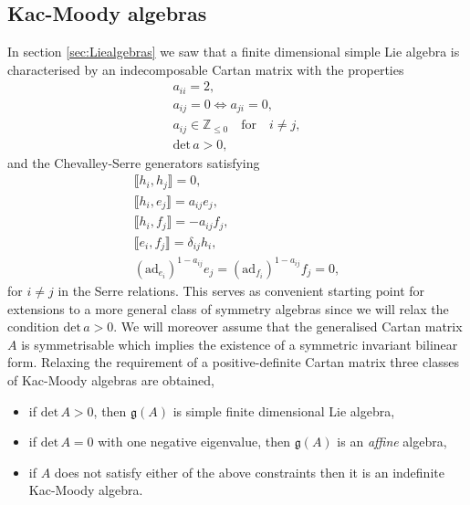 \subsection{Kac-Moody algebras}\label{sec:KacMoody}
In section \ref{sec:Liealgebras} we saw that a finite dimensional simple Lie algebra is characterised by an indecomposable Cartan matrix with the properties 
\begin{equation}
    \begin{aligned}
        a_{ii} = 2,\\
        a_{ij} = 0 \Longleftrightarrow a_{ji} = 0,\\
        a_{ij}\in \mathbb{Z}_{\leq 0} \quad\text{for}\quad i\neq j,\\
        \text{det}\,a >0,
    \end{aligned}
\end{equation}
and the Chevalley-Serre generators satisfying 
\begin{equation}
\begin{aligned}\label{eq:ChevalleySerre2}
    \llbracket h_i,h_j\rrbracket = 0,\\
    \llbracket h_i,e_j\rrbracket = a_{ij}e_{j},\\
    \llbracket h_i,f_j\rrbracket = -a_{ij}f_{j},\\
    \llbracket e_i,f_j\rrbracket = \delta_{ij}h_i,\\
    (\text{ad}_{e_i})^{1-a_{ij}}e_j = (\text{ad}_{f_i})^{1-a_{ij}}f_j = 0,
\end{aligned}
\end{equation}
for $i\neq j$ in the Serre relations. This serves as convenient starting point for extensions to a more general class of symmetry algebras since we will relax the condition $\text{det}\,a>0$. We will moreover assume that the generalised Cartan matrix $A$ is symmetrisable which implies the existence of a symmetric invariant bilinear form. Relaxing the requirement of a positive-definite Cartan matrix three classes of Kac-Moody algebras are obtained,
\begin{itemize}
    \item if $\text{det}\,A >0$, then $\mathfrak{g}(A)$ is simple finite dimensional Lie algebra,
    \item if $\text{det}\,A =0$ with one negative eigenvalue, then $\mathfrak{g}(A)$ is an \emph{affine} algebra,  
    \item if $A$ does not satisfy either of the above constraints then it is an indefinite Kac-Moody algebra.
\end{itemize}

